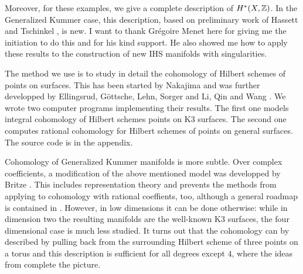 Moreover, for these examples, we give a complete description of $H^*(X,\mathbb{Z})$. In the Generalized Kummer case, this description, based on preliminary work of Hassett and Tschinkel \cite{Hassett}, is new. I want to thank Gr\'egoire Menet here for giving me the initiation to do this and for his kind support. He also showed me how to apply these results to the construction of new IHS manifolds with singularities.

The method we use is to study in detail the cohomology of Hilbert schemes of points on surfaces. This has been started by Nakajima \cite{Nakajima} and was further developped by Ellingsrud, G\"ottsche, Lehn, Sorger \cite{EGL,LehnSorger} and Li, Qin and Wang \cite{LiQinWang,LiQinWang2,QinWang}.
We wrote two computer programs implementing their results. The first one models integral cohomology of Hilbert schemes points on K3 surfaces. The second one computes rational cohomology for Hilbert schemes of points on general surfaces. The source code is in the appendix. 

Cohomology of Generalized Kummer manifolds is more subtle. Over complex coefficients, a modification of the above mentioned model was developped by Britze \cite{Britze}. This includes representation theory and prevents the methods from applying to cohomology with rational coeffients, too, although a general roadmap is contained in \cite{Twisted}.
However, in low dimensions it can be done otherwise: while in dimension two the resulting manifolds are the well-known K3 surfaces, the four dimensional case is much less studied. It turns out that the cohomology can by described by pulling back from the surrounding Hilbert scheme of three points on a torus and this description is sufficient for all degrees except $4$, where the ideas from \cite{Hassett} complete the picture.

